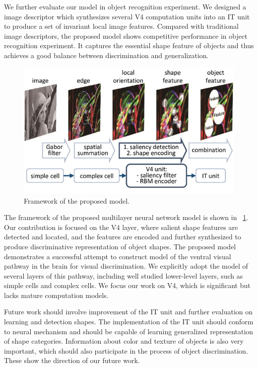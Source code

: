 \documentclass[10pt]{article}
\begin{document}
We further evaluate our model in object recognition experiment.
We designed a image descriptor which synthesizes several V4 computation units
into an IT unit to produce a set of invariant local image features.
Compared with traditional image descriptors,
the proposed model shows competitive performance in object recognition experiment. 
It captures the essential shape feature of objects
and thus achieves a good balance between discrimination and generalization.

\begin{figure}
\centering
\includegraphics[width=0.9\linewidth]{images/fig-17.jpg}
\caption{Framework of the proposed model.}
\label{fig:17}
\end{figure}

The framework of the proposed multilayer neural network model is shown in \figurename~\ref{fig:17}.
Our contribution is focused on the V4 layer,
where salient shape features are detected and located,
and the features are encoded and further synthesized to produce discriminative representation of object shapes.
The proposed model demonstrates a successful attempt to construct model of the ventral visual pathway
in the brain for visual discrimination.
We explicitly adopt the model of several layers of this pathway,
including well studied lower-level layers, such as simple cells and complex cells.
We focus our work on V4, which is significant but lacks mature computation models.

Future work should involve improvement of the IT unit and further evaluation on learning and detection shapes.
The implementation of the IT unit should conform to neural mechanism
and should be capable of learning generalized representation of shape categories.
Information about color and texture of objects is also very important,
which should also participate in the process of object discrimination.
These show the direction of our future work.



\end{document}
